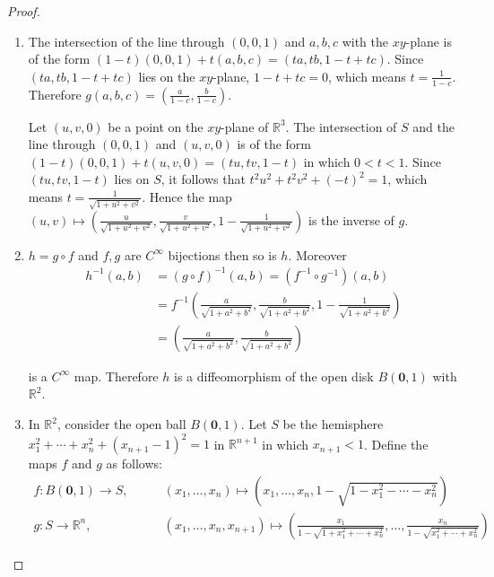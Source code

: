 \begin{proof}
    \begin{enumerate}[label={(\alph*)},leftmargin=*]
        \item The intersection of the line through \( (0, 0, 1) \) and \( a, b, c \) with the \( xy \)-plane is of the form \( (1 - t)(0, 0, 1) + t(a, b, c) = (ta, tb, 1 - t + tc) \). Since \( (ta, tb, 1 - t + tc) \) lies on the \( xy \)-plane, \( 1 - t + tc = 0 \), which means \( t = \frac{1}{1 - c} \). Therefore \( g(a, b, c) = \left(\frac{a}{1 - c}, \frac{b}{1 - c}\right) \).

              Let \( (u, v, 0) \) be a point on the \( xy \)-plane of \( \mathbb{R}^{3} \). The intersection of \( S \) and the line through \( (0, 0, 1) \) and \( (u, v, 0) \) is of the form \( (1 - t)(0, 0, 1) + t(u, v, 0) = (tu, tv, 1 - t) \) in which \( 0 < t < 1 \). Since \( (tu, tv, 1 - t) \) lies on \( S \), it follows that \( t^{2}u^{2} + t^{2}v^{2} + {(-t)}^{2} = 1 \), which means \( t = \frac{1}{\sqrt{1 + u^{2} + v^{2}}} \). Hence the map \( (u, v) \mapsto \left(\frac{u}{\sqrt{1 + u^{2} + v^{2}}}, \frac{v}{\sqrt{1 + u^{2} + v^{2}}}, 1 - \frac{1}{\sqrt{1 + u^{2} + v^{2}}}\right) \) is the inverse of \( g \).
        \item \( h = g\circ f \) and \( f, g \) are \( C^{\infty} \) bijections then so is \( h \). Moreover
              \begin{align*}
                  h^{-1}(a, b) & = {(g\circ f)}^{-1}(a, b) = (f^{-1} \circ g^{-1}) (a, b)                                                                              \\
                               & = f^{-1}\left( \frac{a}{\sqrt{1 + a^{2} + b^{2}}}, \frac{b}{\sqrt{1 + a^{2} + b^{2}}}, 1 - \frac{1}{\sqrt{1 + a^{2} + b^{2}}} \right) \\
                               & = \left( \frac{a}{\sqrt{1 + a^{2} + b^{2}}}, \frac{b}{\sqrt{1 + a^{2} + b^{2}}} \right)
              \end{align*}

              is a \( C^{\infty} \) map. Therefore \( h \) is a diffeomorphism of the open disk \( B(\mathbf{0}, 1) \) with \( \mathbb{R}^{2} \).
        \item In \( \mathbb{R}^{2} \), consider the open ball \( B(\mathbf{0}, 1) \). Let \( S \) be the hemisphere \( x_{1}^{2} + \cdots + x_{n}^{2} + {(x_{n+1} - 1)}^{2} = 1 \) in \( \mathbb{R}^{n+1} \) in which \( x_{n+1} < 1 \). Define the maps \( f \) and \( g \) as follows:
              \begin{align*}
                  f: B(\mathbf{0}, 1) \to S, & \qquad (x_{1}, \ldots, x_{n}) \mapsto \left(x_{1}, \ldots, x_{n}, 1 - \sqrt{1 - x_{1}^{2} - \cdots - x_{n}^{2}}\right)                                                                    \\
                  g: S \to \mathbb{R}^{n},   & \qquad (x_{1}, \ldots, x_{n}, x_{n+1}) \mapsto \left(\frac{x_{1}}{1 - \sqrt{1 + x_{1}^{2} + \cdots + x_{n}^{2}}}, \ldots , \frac{x_{n}}{1 - \sqrt{x_{1}^{2} + \cdots + x_{n}^{2}}}\right)
              \end{align*}


\end{enumerate}
\end{proof}
